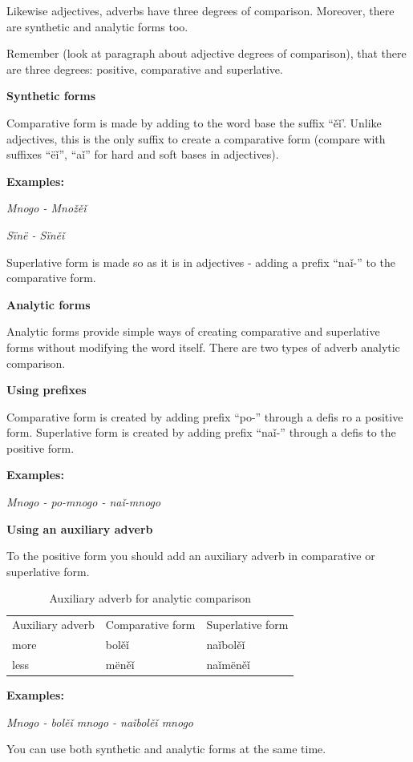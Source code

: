 Likewise adjectives, adverbs have three degrees of comparison. Moreover, there are synthetic and analytic forms too. 

Remember (look at paragraph about adjective degrees of comparison), that there are three degrees: positive, comparative and superlative.

\textbf{Synthetic forms}

Comparative form is made by adding to the word base the suffix “ěǐ’. Unlike adjectives, this is the only suffix to create a comparative form (compare with suffixes “ëǐ”, “aǐ” for hard and soft bases in adjectives). 

\textbf{Examples:}

\textit{Mnogo - Množěǐ}

\textit{Sïnë - Sïněǐ}

Superlative form is made so as it is in adjectives - adding a prefix “naǐ-” to the comparative form.

\textbf{Analytic forms}

Analytic forms provide simple ways of creating comparative and superlative forms without modifying the word itself. There are two types of adverb analytic comparison.

\textbf{Using prefixes}

Comparative form is created by adding prefix “po-” through a defis ro a positive form. Superlative form is created by adding prefix “naǐ-” through a defis to the positive form.

\textbf{Examples:}

\textit{Mnogo - po-mnogo - naǐ-mnogo}

\textbf{Using an auxiliary adverb}

To the positive form you should add an auxiliary adverb in comparative or superlative form.

\begin{table}[!htb]
	\caption{Auxiliary adverb for analytic comparison}
	\begin{tabular}{lll}
		Auxiliary adverb
		& Comparative form
		& Superlative form \\
		more & bolěǐ & naǐbolěǐ \\
		less & mëněǐ & naǐmëněǐ \\
	\end{tabular}
\end{table}

\textbf{Examples:}

\textit{Mnogo - bolěǐ mnogo - naǐbolěǐ mnogo}

You can use both synthetic and analytic forms at the same time.
